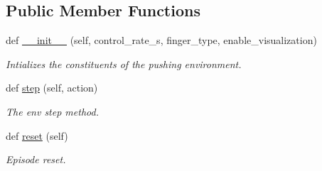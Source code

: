 \subsection*{Public Member Functions}
\begin{DoxyCompactItemize}
\item 
def \hyperlink{classtrifinger__simulation_1_1gym__wrapper_1_1envs_1_1trifinger__push_1_1TriFingerPush_aa6c84179b96f31cd9c464598c14cee39}{\+\_\+\+\_\+init\+\_\+\+\_\+} (self, control\+\_\+rate\+\_\+s, finger\+\_\+type, enable\+\_\+visualization)
\begin{DoxyCompactList}\small\item\em Intializes the constituents of the pushing environment. \end{DoxyCompactList}\item 
def \hyperlink{classtrifinger__simulation_1_1gym__wrapper_1_1envs_1_1trifinger__push_1_1TriFingerPush_a9d02a422dd3e4fc843c1625bc3b48563}{step} (self, action)
\begin{DoxyCompactList}\small\item\em The env step method. \end{DoxyCompactList}\item 
def \hyperlink{classtrifinger__simulation_1_1gym__wrapper_1_1envs_1_1trifinger__push_1_1TriFingerPush_a37f86f66dd9d3268f0df751fc295df23}{reset} (self)
\begin{DoxyCompactList}\small\item\em Episode reset. \end{DoxyCompactList}\end{DoxyCompactItemize}
